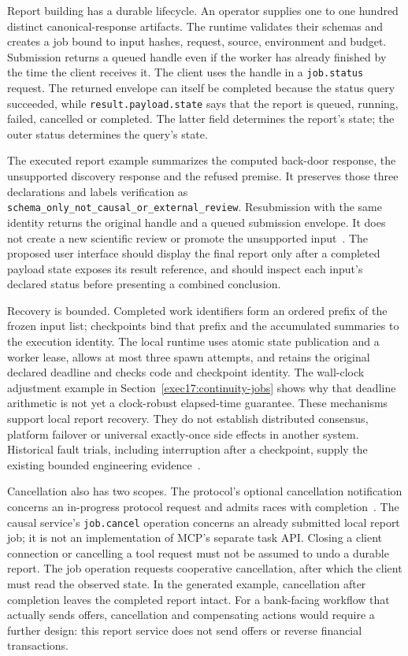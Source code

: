 Report building has a durable lifecycle. An operator supplies one to one
hundred distinct canonical-response artifacts. The runtime validates their
schemas and creates a job bound to input hashes, request, source, environment
and budget. Submission returns a queued handle even if the worker has
already finished by the time the client receives it. The client uses the
handle in a \texttt{job.status} request. The returned envelope can itself
be completed because the status query succeeded, while
\texttt{result.payload.state} says that the report is queued, running,
failed, cancelled or completed. The latter field determines the report's
state; the outer status determines the query's state.

The executed report example summarizes the computed back-door response,
the unsupported discovery response and the refused premise. It preserves
those three declarations and labels verification as
\texttt{schema\_only\_not\_causal\_or\_external\_review}. Resubmission with
the same identity returns the original handle and a queued submission
envelope. It does not create a new scientific review or promote the
unsupported input~\citep{exec13_i2_examples}. The proposed user interface
should display the final report only after a completed payload state exposes
its result reference, and should inspect each input's declared status before
presenting a combined conclusion.

Recovery is bounded. Completed work identifiers form an ordered prefix of
the frozen input list; checkpoints bind that prefix and the accumulated
summaries to the execution identity. The local runtime uses atomic state
publication and a worker lease, allows at most three spawn attempts, and
retains the original declared deadline and checks code and checkpoint identity. The wall-clock adjustment example in Section~\ref{exec17:continuity-jobs} shows why that deadline arithmetic is not yet a clock-robust elapsed-time guarantee. These mechanisms support local report
recovery. They do not establish distributed consensus, platform failover or
universal exactly-once side effects in another system. Historical fault
trials, including interruption after a checkpoint, supply the existing
bounded engineering evidence~\citep{v12_in_runtime}.

Cancellation also has two scopes. The protocol's optional cancellation
notification concerns an in-progress protocol request and admits races with
completion~\citep{v12_mcp_legacy_cancellation}. The causal service's
\texttt{job.cancel} operation concerns an already submitted local report
job; it is not an implementation of MCP's separate task API. Closing a
client connection or cancelling a tool request must not be assumed to undo
a durable report. The job operation requests cooperative cancellation,
after which the client must read the observed state. In the generated
example, cancellation after completion leaves the completed report intact.
For a bank-facing workflow that actually sends offers, cancellation and
compensating actions would require a further design: this report service
does not send offers or reverse financial transactions.

